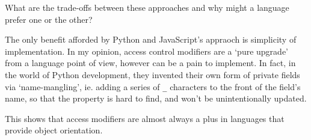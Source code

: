 \documentclass{article}
\begin{document}
\begin{enumerate}
{        What are the trade-offs between these approaches and why might a language prefer one or the other?

        The only benefit afforded by Python and JavaScript's appraoch is simplicity 
        of implementation. In my opinion, access control modifiers are a `pure upgrade'
        from a language point of view, however can be a pain to implement. In fact,
        in the world of Python development, they invented their own form of private
        fields via `name-mangling', ie. adding a series of \verb|_| characters 
        to the front of the field's name, so that the property is hard to find, 
        and won't be unintentionally updated.

        This shows that access modifiers are almost always a plus in languages 
        that provide object orientation.
    }
\end{enumerate}
\end{document}
